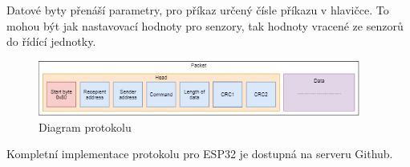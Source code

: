 Datové byty přenáší parametry, pro příkaz určený čísle příkazu v hlavičce.
To mohou být jak nastavovací hodnoty pro senzory, tak hodnoty vracené ze senzorů do řídící jednotky.

\begin{figure}[h]
    \begin{small}
        \begin{center}
            \includegraphics[width=400px]{img/Protocol_diagram.png}
        \end{center}
        \caption{Diagram protokolu}
        \label{fig: Diagram protokolu}
    \end{small}
\end{figure}


Kompletní implementace protokolu pro ESP32 je dostupná na serveru Github.\cite{protocol}


